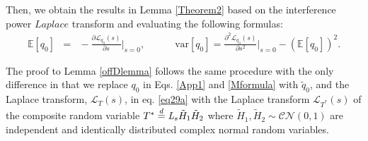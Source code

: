 \documentclass[12pt, draftclsnofoot, onecolumn]{IEEEtran}
\theoremstyle{plain}
\begin{document}
Then, we obtain the results in Lemma \ref{Theorem2} based on the interference power $Laplace$ transform and evaluating the following formulas:
\begin{eqnarray}\label{Mformula}
\!\!\!\!\!\!\!\!\!\!\!\!\! \mathbb{E}\left[\mathit{{q}}_{0}\right]&\!\!\!=&\!\!\!\!\!-{\frac{\partial \mathcal{L}_{\mathit{{q}}_{0}}(s)}{\partial s}}\bigg|_{s=0}, \quad \quad \quad \!\! %
\text{var}\left[\mathit{{q}}_{0}\right]={\frac{\partial^2 \mathcal{L}_{\mathit{{q}}_{0}}(s)}{\partial s^2}}\bigg|_{s=0} \!\!\!\!\!\!- \left( \mathbb{E}\left[\mathit{{q}}_{0}\right] \right)^2.
\end{eqnarray}
%

The proof to Lemma \ref{offDlemma} follows the same procedure with the only difference in that we replace $\mathit{{q}}_{0}$ in Eqs. \eqref{App1} and \eqref{Mformula} with $\mathit{\tilde{q}}_{0}$, and the Laplace transform, $ \mathcal{L}_{T}(s) $, 
in eq. \eqref{eq29a}
with the Laplace transform $ \mathcal{L}_{T^*}(s) $ of the composite random variable $ T^* \buildrel d \over = \mathit{L}_s \tilde{H}_1 \tilde{H}_2 $ where $\tilde{H}_1, \tilde{H}_2 \sim \mathcal{CN}(0,1)$ are independent and identically distributed complex normal random variables.
\iffalse
\end{document}
